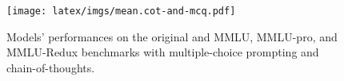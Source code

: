 \begin{figure}[th!]
\centering
\texttt{[image: latex/imgs/mean.cot-and-mcq.pdf]}
\caption{Models' performances on the original and \wicds MMLU, MMLU-pro, and MMLU-Redux benchmarks with multiple-choice prompting and chain-of-thoughts.}
\label{fig:cot-res}
\end{figure} 